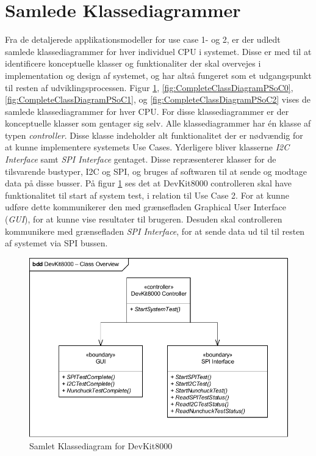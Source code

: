 \section{Samlede Klassediagrammer}
Fra de detaljerede applikationsmodeller for use case 1- og 2, er der udledt samlede klassediagrammer for hver individuel CPU i systemet. Disse er med til at identificere konceptuelle klasser og funktionaliter der skal overvejes i implementation og design af systemet, og har altså fungeret som et udgangspunkt til resten af udviklingsprocessen.\newline\noindent
Figur \ref{fig:CompleteClassDiagramDevKit8000}, \ref{fig:CompleteClassDiagramPSoC0}, \ref{fig:CompleteClassDiagramPSoC1}, og \ref{fig:CompleteClassDiagramPSoC2} vises de samlede klassediagrammer for hver CPU.\newline\noindent
For disse klassediagrammer er der konceptuelle klasser som gentager sig selv. Alle klassediagrammer har én klasse af typen \textit{controller}. Disse klasse indeholder alt funktionalitet der er nødvændig for at kunne implementere systemets Use Cases. Yderligere bliver klasserne \textit{I2C Interface} samt \textit{SPI Interface} gentaget. Disse repræsenterer klasser for de tilsvarende bustyper, I2C og SPI, og bruges af softwaren til at sende og modtage data på disse busser.\newline\noindent
På figur \ref{fig:CompleteClassDiagramDevKit8000} ses det at DevKit8000 controlleren skal have funktionalitet til start af system test, i relation til Use Case 2. For at kunne udføre dette kommunikerer den med grænsefladen Graphical User Interface (\textit{GUI}), for at kunne vise resultater til brugeren. Desuden skal controlleren kommunikere med grænsefladen \textit{SPI Interface}, for at sende data ud til til resten af systemet via SPI bussen.

\begin{figure}[H]
	\centering
	\includegraphics[width=\textwidth] {Systemarkitektur/images/CompleteClassDiagramDevKit8000}
	\caption{Samlet Klassediagram for DevKit8000}
	\label{fig:CompleteClassDiagramDevKit8000}
\end{figure}

